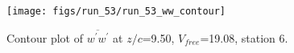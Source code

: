 \begin{figure}[H]
\centering
\texttt{[image: figs/run\_53/run\_53\_ww\_contour]}
\caption{Contour plot of $\overline{w^\prime w^\prime}$ at $z/c$=9.50, $V_{free}$=19.08, station 6.}
\end{figure}


